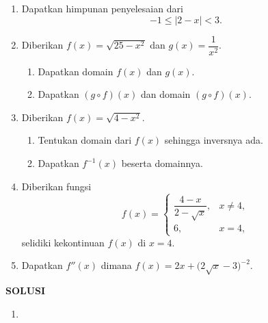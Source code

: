 \documentclass[10pt,openany,a4paper]{article}
\renewcommand{\headrulewidth}{0pt}
\begin{document}
\begin{enumerate}
    \item Dapatkan himpunan penyelesaian dari
          \[
              -1 \leq |2 - x| < 3.
          \]

    \item Diberikan $f(x) = \sqrt{25 - x^2}$ dan $g(x) = \dfrac{1}{x^2}$.
          \begin{enumerate}
              \item Dapatkan domain $f(x)$ dan $g(x)$.
              \item Dapatkan $(g \circ f)(x)$ dan domain $(g \circ f)(x)$.
          \end{enumerate}

    \item Diberikan $f(x) = \sqrt{4 - x^2}$.
          \begin{enumerate}
              \item Tentukan domain dari $f(x)$ sehingga inversnya ada.
              \item Dapatkan $f^{-1}(x)$ beserta domainnya.
          \end{enumerate}

    \item Diberikan fungsi
          \[
              f(x) =
              \begin{cases}
                  \dfrac{4 - x}{2 - \sqrt{x}}, & x \neq 4, \\[1em]
                  6,                           & x = 4,
              \end{cases}
          \]
          selidiki kekontinuan $f(x)$ di $x = 4$.

    \item Dapatkan $f''(x)$ dimana
          $
              f(x) = 2x + \bigl( 2\sqrt{x} - 3 \bigr)^{-2}.
          $

\end{enumerate}



\newpage
{}
{\centering\textbf{SOLUSI}}
\renewcommand{\arraystretch}{1.5}
\renewcommand{\headrulewidth}{1pt}
\begin{enumerate}
    \item
\end{enumerate}
\end{document}
